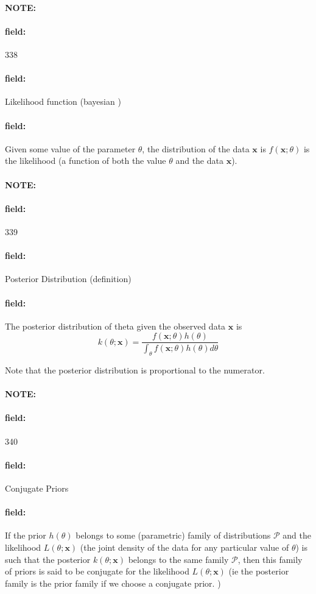 \documentclass[12pt]{article}
\newenvironment{note}{\paragraph{NOTE:}}{}
\newenvironment{field}{\paragraph{field:}}{}
\begin{document}
\begin{note}
    \begin{field}
        \tiny 338
    \end{field}
    \begin{field}
        Likelihood function (bayesian )
    \end{field}
    \begin{field}
        Given some value of the parameter $\theta$, the distribution of the data $\mathbf{x}$ is $f(\mathbf{x};\theta)$ is the likelihood (a function of both the value $\theta$ and the data $\mathbf{x}$).
    \end{field}
\end{note}

\begin{note}
    \begin{field}
        \tiny 339
    \end{field}
    \begin{field}
        Posterior Distribution (definition)
    \end{field}
    \begin{field}
        The posterior distribution of theta given the observed data $\mathbf{x}$ is $$k(\theta;\mathbf{x}) = \frac{f(\mathbf{x};\theta)h(\theta)}{\int_\theta f(\mathbf{x};\theta)h(\theta)d\theta} $$

        Note that the posterior distribution is proportional to the numerator.
    \end{field}
\end{note}

\begin{note}
    \begin{field}
        \tiny 340
    \end{field}
    \begin{field}
        Conjugate Priors
    \end{field}
    \begin{field}
        If the prior $h(\theta)$ belongs to some (parametric) family of distributions $\mathscr{P}$ and the likelihood $L(\theta;\mathbf{x})$ (the joint density of the data for any particular value of $\theta$) is such that the posterior $k(\theta;\mathbf{x})$ belongs to the same family $\mathscr{P}$, then this family of priors is said to be conjugate for the likelihood $L(\theta;\mathbf{x})$ (ie the posterior family is the prior family if we choose a conjugate prior. )
    \end{field}
\end{note}
\end{document}
